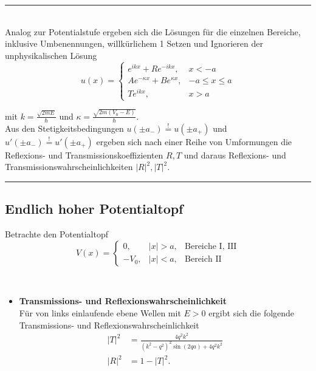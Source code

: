 \documentclass{article}
\begin{document}
\newpage


{\color{violet}
\hrule
	\\
	Analog zur Potentialstufe ergeben sich die Lösungen für die einzelnen Bereiche, inklusive Umbenennungen, willkürlichem 1 Setzen und Ignorieren der unphysikalischen Lösung
		$$u(x) =
		\begin{cases}
			e^{ikx} + Re^{-ikx}, & x<-a \\
			Ae^{-\kappa x}  + Be^{\kappa x}, & -a\leq x\leq a \\
			Te^{ikx}, & x>a
		\end{cases}$$

	mit $k = \frac{\sqrt{2mE}}{\hbar}$ und $\kappa = \frac{\sqrt{2m(V_0-E)}}{\hbar}$.\\
	Aus den Stetigkeitsbedingungen $u(\pm a_-)\stackrel{!}{=}u(\pm a_+)$ und $u'(\pm a_-)\stackrel{!}{=}u'(\pm a_+)$ ergeben sich nach einer Reihe von Umformungen die Reflexions- und Transmissionskoeffizienten $R,T$ und daraus Reflexions- und Transmissionswahrscheinlichkeiten $|R|^2, |T|^2$.
	
\hrule
}



\newpage



\subsection{Endlich hoher Potentialtopf}
Betrachte den Potentialtopf
	\begin{equation}
			V(x) = \left\{
		\begin{matrix}
			0, & |x| > a, & \text{Bereiche I, III}\\
			-V_0, & |x| < a, & \text{Bereich II}
		\end{matrix}\right.
	\end{equation}


\\
	\begin{itemize}
		\item \textbf{Transmissions- und Reflexionswahrscheinlichkeit}\\
		Für von links einlaufende ebene Wellen mit $E>0$ ergibt sich die folgende Transmissions- und Reflexionswahrscheinlichkeit
			\begin{align}
				|T|^2 &= \frac{4q^2k^2}{(k^2-q^2)^2\sin(2qa) + 4q^2k^2}	\\
				|R|^2 &= 1 - |T|^2.
			\end{align}
	\end{itemize}
\end{document}
